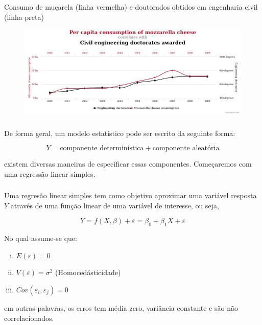 \documentclass[14pt,aspectratio=1610]{beamer}
\begin{document}
\begin{frame}{}
\frametitle{ }
\begin{block}{}
\justifying
Consumo de muçarela (linha vermelha) e doutorados obtidos em engenharia civil (linha preta)
\end{block}
\begin{figure}[H]
    \centering
    \includegraphics[scale=0.5]{Figuras/Mucarela}
\end{figure}
\end{frame}

\begin{frame}{}
\frametitle{ }
\begin{block}{}
\justifying
De forma geral, um modelo estatístico pode ser escrito da seguinte forma:

$$Y=\textrm{componente determinística}+\textrm{componente aleatória}$$

existem diversas maneiras de específicar essas componentes. Começaremos com uma regressão linear simples.

\end{block}
\end{frame}


\begin{frame}{}
\frametitle{ }
\begin{block}{}
\justifying
Uma regresão linear simples tem como objetivo aproximar uma variável resposta $Y$ através de uma função linear de uma variável de interesse, ou seja,

$$Y=f(X,\beta)+\varepsilon=\beta_{0}+\beta_{1}X+\varepsilon$$

No qual assume-se que:

\begin{enumerate}[(i)]
\item $E(\varepsilon)=0$\pause
\item $V(\varepsilon)=\sigma^{2}$ (Homocedásticidade)\pause
\item $Cov(\varepsilon_{i},\varepsilon_{j})=0$
\end{enumerate}

em outras palavras, os erros tem média zero, variância constante e são não correlacionados.

\end{block}
\end{frame}
\end{document}
